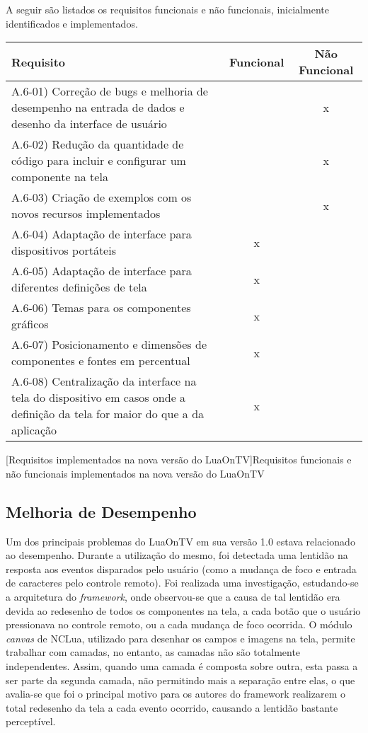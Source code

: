 A seguir são listados os requisitos funcionais e não funcionais, inicialmente identificados e implementados.

\begin{center}
\scriptsize {
	\begin{tabular}{|p{11cm}|c|c|}%
    \hline
		\textbf{Requisito} & \textbf{Funcional} & \textbf{Não Funcional} \\
    \hline
		A.6-01) Correção de bugs e melhoria de desempenho na entrada de dados e desenho da interface de usuário &  & x \\
    \hline
		A.6-02) Redução da quantidade de código para incluir e configurar um componente na tela &  & x \\
    \hline
		A.6-03) Criação de exemplos com os novos recursos implementados &  & x \\
    \hline
		A.6-04) Adaptação de interface para dispositivos portáteis & x &  \\
    \hline
		A.6-05) Adaptação de interface para diferentes definições de tela & x & \\
    \hline
		A.6-06) Temas para os componentes gráficos & x &  \\
    \hline
		A.6-07) Posicionamento e dimensões de componentes e fontes em percentual & x &  \\
    \hline
		A.6-08) Centralização da interface na tela do dispositivo em casos onde a definição
    da tela for maior do que a da aplicação & x &  \\
    \hline
	\end{tabular}
	[Requisitos implementados na nova versão do LuaOnTV]{Requisitos funcionais e não funcionais implementados na nova versão do LuaOnTV}
	\label{tab:requisitos-novo-luaontv}
}
\end{center}

\subsection{Melhoria de Desempenho}

Um dos principais problemas do LuaOnTV em sua versão 1.0 estava relacionado ao desempenho.
Durante a utilização do mesmo, foi detectada uma lentidão na resposta aos eventos disparados pelo usuário 
(como a mudança de foco e entrada de caracteres pelo controle remoto).
Foi realizada uma investigação, estudando-se a arquitetura do \textit{framework},
onde observou-se que a causa de tal lentidão era devida ao redesenho de todos
os componentes na tela, a cada botão que o usuário pressionava no controle remoto,
ou a cada mudança de foco ocorrida. O módulo \textit{canvas} de NCLua, utilizado para 
desenhar os campos e imagens na tela, permite trabalhar com camadas, no entanto,
as camadas não são totalmente independentes. Assim, quando uma camada 
é composta sobre outra, esta passa a ser parte da segunda camada, não
permitindo mais a separação entre elas, o que avalia-se que foi o principal
motivo para os autores do framework realizarem o total redesenho da tela 
a cada evento ocorrido, causando a lentidão bastante perceptível.

